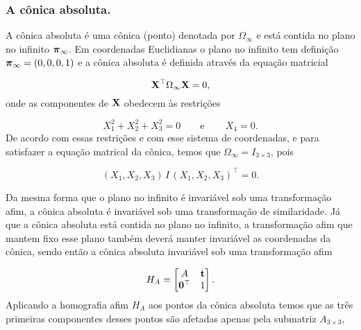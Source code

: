 \subsubsection{A cônica absoluta.}\label{sec.con-absoluta}

A cônica absoluta é uma cônica (ponto) denotada por $\Omega_\infty$ e está contida no plano no infinito $\boldsymbol{\pi}_\infty$. Em coordenadas Euclidianas o plano no infinito tem definição $\boldsymbol{\pi}_\infty=(0,0,0,1)$ e a cônica absoluta é definida através da equação matricial

\begin{equation*}
\mathbf{X}^\top\Omega_\infty\mathbf{X}=0,
\end{equation*} 
onde as componentes de $\mathbf{X}$ obedecem às restrições

\begin{equation*}
X_1^2+X_2^2+X_3^2=0\qquad\text{e}\qquad\,X_4=0.
\end{equation*}
De acordo com essas restrições e com esse sistema de coordenadas, e para satisfazer a equação matrical da cônica, temos que $\Omega_\infty=I_{3\times3}$, pois

\begin{equation*}
(X_1,X_2,X_3)\,I\,(X_1,X_2,X_3)^\top=0.
\end{equation*}

Da mesma forma que o plano no infinito é invariável sob uma transformação afim, a cônica absoluta é invariável sob uma transformação de similaridade. Já que a cônica absoluta está contida no plano no infinito, a transformação afim que mantem fixo esse plano também deverá manter invariável as coordenadas da cônica, sendo então a cônica absoluta invariável sob uma transformação afim

\begin{equation*}
H_A=
\begin{bmatrix}
A&{\bf t}\\
{\bf 0}^\top&1
\end{bmatrix}.
\end{equation*}
Aplicando a homografia afim $H_A$ aos pontos da cônica absoluta temos que as três primeiras componentes desses pontos são afetadas apenas pela submatriz $A_{3\times3}$,

